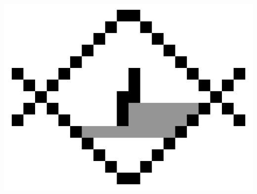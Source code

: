 \documentclass[11pt,class=report,crop=false]{standalone}
\begin{document}
\begin{center}
	\includegraphics[scale=\myscale,scale=0.20]{figures/fill02_003}
\end{center}
\end{document}
